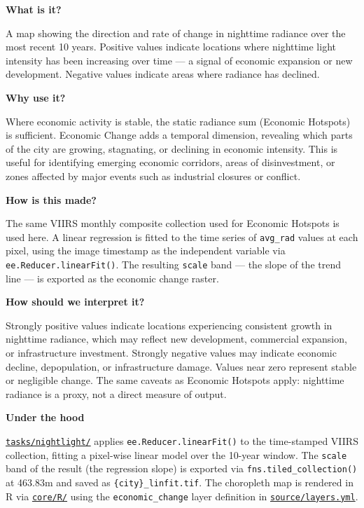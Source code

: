 \documentclass[
  letterpaper,
  DIV=11,
  numbers=noendperiod]{scrreprt}
\begin{document}
\textbf{What is it?}

A map showing the direction and rate of change in nighttime radiance
over the most recent 10 years. Positive values indicate locations where
nighttime light intensity has been increasing over time --- a signal of
economic expansion or new development. Negative values indicate areas
where radiance has declined.

\textbf{Why use it?}

Where economic activity is stable, the static radiance sum (Economic
Hotspots) is sufficient. Economic Change adds a temporal dimension,
revealing which parts of the city are growing, stagnating, or declining
in economic intensity. This is useful for identifying emerging economic
corridors, areas of disinvestment, or zones affected by major events
such as industrial closures or conflict.

\textbf{How is this made?}

The same VIIRS monthly composite collection used for Economic Hotspots
is used here. A linear regression is fitted to the time series of
\texttt{avg\_rad} values at each pixel, using the image timestamp as the
independent variable via \texttt{ee.Reducer.linearFit()}. The resulting
\texttt{scale} band --- the slope of the trend line --- is exported as
the economic change raster.

\textbf{How should we interpret it?}

Strongly positive values indicate locations experiencing consistent
growth in nighttime radiance, which may reflect new development,
commercial expansion, or infrastructure investment. Strongly negative
values may indicate economic decline, depopulation, or infrastructure
damage. Values near zero represent stable or negligible change. The same
caveats as Economic Hotspots apply: nighttime radiance is a proxy, not a
direct measure of output.

\textbf{Under the hood}

\href{../tasks/nightlight/}{\texttt{tasks/nightlight/}} applies
\texttt{ee.Reducer.linearFit()} to the time-stamped VIIRS collection,
fitting a pixel-wise linear model over the 10-year window. The
\texttt{scale} band of the result (the regression slope) is exported via
\texttt{fns.tiled\_collection()} at 463.83m and saved as
\texttt{\{city\}\_linfit.tif}. The choropleth map is rendered in R via
\href{../core/R/}{\texttt{core/R/}} using the \texttt{economic\_change}
layer definition in
\href{../source/layers.yml}{\texttt{source/layers.yml}}.
\end{document}
